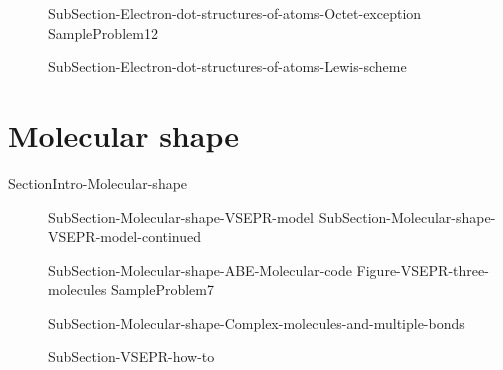 \documentclass[main.tex]{subfiles}
\newcommand\chapterlabel{Ch-naming}\setcounter{figurenewcounter}{0}\setcounter{tablenewcounter}{0}\setcounter{formulanewcounter}{0}\chapterpicture{../{\chapterlabel}/figure1}\chapterpicturelabel{Pixnio}
\begin{document}
{\begin{description}
\item[] {SubSection-Electron-dot-structures-of-atoms-Octet-exception}
{SampleProblem12}
\item[]{SubSection-Electron-dot-structures-of-atoms-Lewis-scheme}  
\end{description}

 \section{Molecular shape}{SectionIntro-Molecular-shape}
 \newpage\hspace{-10cm}{Table-Molecular-geometries}
\sloppy\begin{description}
\item[] {SubSection-Molecular-shape-VSEPR-model}
\newpage\hspace{10cm}{Figure-VSEPR-three-molecules-one}
 {SubSection-Molecular-shape-VSEPR-model-continued}
\item[] {SubSection-Molecular-shape-ABE-Molecular-code}
{Figure-VSEPR-three-molecules}
{SampleProblem7}
\item[] {SubSection-Molecular-shape-Complex-molecules-and-multiple-bonds}
\item[]{SubSection-VSEPR-how-to}  
\end{description}


}
\end{document}
